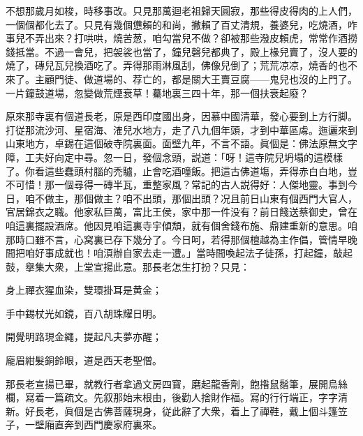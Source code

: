 不想那歲月如梭，時移事改。只見那萬迴老祖歸天圓寂，那些得皮得肉的上人們，一個個都化去了。只見有幾個憊賴的和尚，撇賴了百丈清規，養婆兒，吃燒酒，咋事兒不弄出來？打哄哄，燒苦葱，咱勾當兒不做？卻被那些潑皮賴虎，常常作酒撈錢抵當。不過一會兒，把袈裟也當了，鐘兒磬兒都典了，殿上椽兒賣了，沒人要的燒了，磚兒瓦兒換酒吃了。弄得那雨淋風刮，佛像兒倒了；荒荒凉凉，燒香的也不來了。主顧門徒、做道場的、荐亡的，都是關大王賣豆腐——鬼兒也沒的上門了。一片鐘鼓道場，忽變做荒煙衰草！驀地裏三四十年，那一個扶衰起廢？

原來那寺裏有個道長老，原是西印度國出身，因慕中國清華，發心要到上方行脚。打従那流沙河、星宿海、㴶兒水地方，走了八九個年頭，才到中華區䖏。迤邐來到山東地方，卓錫在這個破寺院裏面。面壁九年，不言不語。眞個是：佛法原無文字障，工夫好向定中尋。忽一日，發個念頭，説道：「呀！這寺院兒坍塌的這模樣了。你看這些蠢頭村腦的禿驢，止會吃酒噇飯。把這古佛道塲，弄得赤白白地，豈不可惜！那一個尋得一磚半瓦，重整家風？常記的古人説得好：人傑地靈。事到今日，咱不做主，那個做主？咱不出頭，那個出頭？况且前日山東有個西門大官人，官居錦衣之職。他家私巨萬，富比王侯，家中那一件没有？前日餞送蔡御史，曾在咱這裏擺設酒席。他因見咱這裏寺宇傾頽，就有個舍錢布施、鼎建重新的意思。咱那時口雖不言，心窝裏已存下幾分了。今日呵，若得那個檀越為主作倡，管情早晚間把咱好事成就也！咱湏辦自家去走一遭。」當時間喚起法子徒孫，打起鐘，敲起鼓，擧集大衆，上堂宣揚此意。那長老怎生打扮？只見：

\begin{myquote}
身上禪衣猩血染，雙環掛耳是黄金；

手中錫杖光如鏡，百八胡珠耀日明。

開覺明路現金繩，提起凡夫夢亦醒；

龐眉紺髮銅鈴眼，道是西天老聖僧。
\end{myquote}

那長老宣揚已畢，就教行者拿過文房四寳，磨起龍香劑，飽揝鼠鬚筆，展開烏絲欄，寫着一篇疏文。先叙那始末根由，後勸人捨財作福。寫的行行端正，字字清新。好長老，眞個是古佛菩薩現身，従此辭了大衆，着上了禪鞋，戴上個斗篷笠子，一壁廂直奔到西門慶家府裏來。

